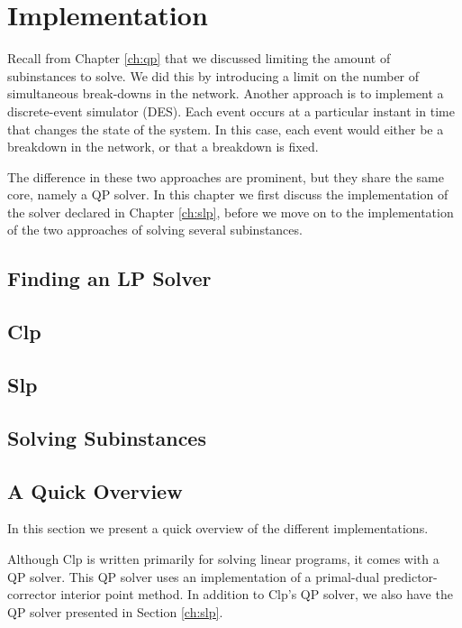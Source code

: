 \section{Implementation}
Recall from Chapter \ref{ch:qp} that we discussed limiting the amount
of subinstances to solve. We did this by introducing a limit on the number of
simultaneous break-downs in the network.
Another approach is to implement a discrete-event simulator (DES). Each event
occurs at a particular instant in time that changes the state of the system.
In this case, each event would either be a breakdown in the network, or that
a breakdown is fixed.

The difference in these two approaches are prominent, but they share the same
core, namely a QP solver. In this chapter we first discuss the implementation
of the solver declared in Chapter \ref{ch:slp}, before we move on to the
implementation of the two approaches of solving several subinstances.
\label{ch:implementation}

\subsection{Finding an LP Solver}


\subsection{Clp}


\subsection{Slp}


\subsection{Solving Subinstances}


\subsection{A Quick Overview}
In this section we present a quick overview of the different
implementations.

Although Clp is written primarily for solving linear
programs, it comes with a QP solver. This QP solver uses an implementation
of a primal-dual predictor-corrector interior point method. In addition
to Clp's QP solver, we also have the QP solver presented in Section
\ref{ch:slp}.

